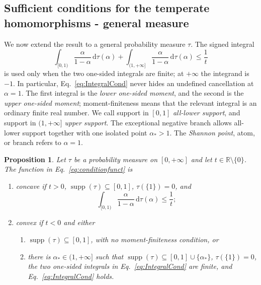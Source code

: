 \documentclass[aps,pra,11pt,onecolumn,nofootinbib,tightenlines]{revtex4-2}
\newtheorem{proposition}[theorem]{Proposition}
\theoremstyle{definition}
\newcommand{\R}{\mathbb{R}}
\def\d{\mathrm{d}}
\begin{document}
\subsection{Sufficient conditions for the temperate homomorphisms - general measure}

We now extend the result to a general probability measure $\tau$.  The signed
integral
\begin{equation}
\label{eq:IntegralCond}
\int_{[0,1)}\frac{\alpha}{1-\alpha}\,\d\tau(\alpha)
+\int_{(1,+\infty]}\frac{\alpha}{1-\alpha}\,\d\tau(\alpha)
\leq\frac1t
\end{equation}
is used only when the two one-sided integrals are finite; at $+\infty$ the
integrand is $-1$.  In particular, Eq.~\eqref{eq:IntegralCond} never hides an
undefined cancellation at $\alpha=1$.
The first integral is the \emph{lower one-sided moment}, and the second is the
\emph{upper one-sided moment}; moment-finiteness means that the relevant
integral is an ordinary finite real number.  We call support in $[0,1]$
\emph{all-lower support}, and support in $(1,+\infty]$ \emph{upper support}.
The exceptional negative branch allows all-lower support together with one
isolated point $\alpha_*>1$.  The \emph{Shannon point}, atom, or branch refers
to $\alpha=1$.

\begin{proposition}
\label{prop:sufficient-conditions}
Let $\tau$ be a probability measure on $[0,+\infty]$ and let
$t\in\R\setminus\{0\}$.  The function in Eq.~\eqref{eq:conditionfunct} is
\begin{enumerate}
\item concave if $t>0$,
$\operatorname{supp}(\tau)\subseteq[0,1]$, $\tau(\{1\})=0$, and
\begin{equation}
\int_{[0,1)}\frac{\alpha}{1-\alpha}\,\d\tau(\alpha)\leq\frac1t;
\end{equation}
\item convex if $t<0$ and either
  \begin{enumerate}[label=(\alph*)]
  \item $\operatorname{supp}(\tau)\subseteq[0,1]$, with no moment-finiteness
  condition, or
  \item there is $\alpha_*\in(1,+\infty]$ such that
  $\operatorname{supp}(\tau)\subseteq[0,1]\cup\{\alpha_*\}$,
  $\tau(\{1\})=0$, the two one-sided integrals in
  Eq.~\eqref{eq:IntegralCond} are finite, and Eq.~\eqref{eq:IntegralCond} holds.
  \end{enumerate}
\end{enumerate}
\end{proposition}
\end{document}

